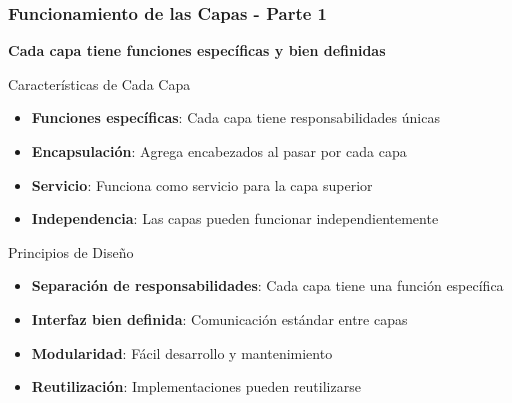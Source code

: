 \documentclass[aspectratio=169]{beamer}
\begin{document}
            \begin{frame}
            \frametitle{Funcionamiento de las Capas - Parte 1}
            
            \begin{center}
            \Large \textbf{Cada capa tiene funciones específicas y bien definidas}
            \end{center}
            
            \begin{block}{Características de Cada Capa}
            \begin{itemize}
            \item \textbf{Funciones específicas}: Cada capa tiene responsabilidades únicas
            \item \textbf{Encapsulación}: Agrega encabezados al pasar por cada capa
            \item \textbf{Servicio}: Funciona como servicio para la capa superior
            \item \textbf{Independencia}: Las capas pueden funcionar independientemente
            \end{itemize}
            \end{block}
            
            \begin{block}{Principios de Diseño}
            \begin{itemize}
            \item \textbf{Separación de responsabilidades}: Cada capa tiene una función específica
            \item \textbf{Interfaz bien definida}: Comunicación estándar entre capas
            \item \textbf{Modularidad}: Fácil desarrollo y mantenimiento
            \item \textbf{Reutilización}: Implementaciones pueden reutilizarse
            \end{itemize}
            \end{block}
            \end{frame}
            
\end{document}
